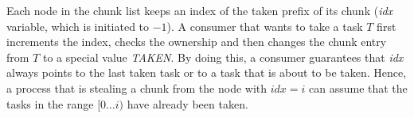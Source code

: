 Each node in the chunk list keeps an index of the taken prefix of its chunk (\emph{idx} variable, which is initiated to $-1$). 
A consumer that wants to take a task $T$ first increments the index, checks the ownership and then changes the chunk entry from $T$ to a special value \emph{TAKEN}. By doing this, a consumer guarantees that \emph{idx} always points to the last taken task or to a task that is about to be taken. Hence, a process that is stealing a chunk from the node with $\textit{idx} = i$ can assume that the tasks in the range $[0 \ldots i)$ have already been taken.




